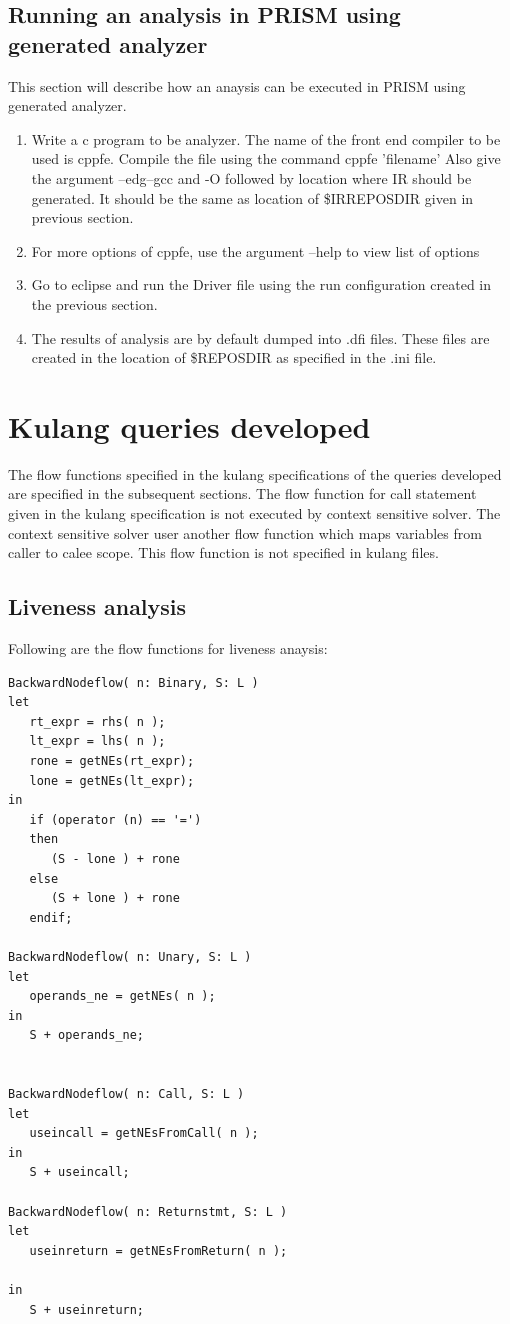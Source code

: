 \documentclass[12pt]{report}
\begin{document}
\section{Running an analysis in PRISM using generated analyzer}

This section will describe how an anaysis can be executed in PRISM using generated analyzer.

\begin{enumerate}
\item Write a c program to be analyzer. The name of the front end compiler to be used is cppfe. Compile the file using the command cppfe 'filename' Also give the argument --edg--gcc and -O followed by location where IR should be generated. It should be the same as location of \$IRREPOSDIR given in previous section.
\item For more options of cppfe, use the argument --help to view list of options
\item Go to eclipse and run the Driver file using the run configuration created in the previous section.
\item The results of analysis are by default dumped into .dfi files. These files are created in the location of \$REPOSDIR as specified in the .ini file.
\end{enumerate}


\newpage
\chapter{Kulang queries developed}
The flow functions specified in the kulang specifications of the queries developed are specified in the subsequent sections. The flow function for call statement given in the kulang specification is not executed by context sensitive solver. The context sensitive solver user another flow function which maps variables from caller to calee scope. This flow function is not specified in kulang files. 

\section{Liveness analysis}

Following are the flow functions for liveness anaysis:

\begin{verbatim}
BackwardNodeflow( n: Binary, S: L ) 
let
   rt_expr = rhs( n );
   lt_expr = lhs( n );
   rone = getNEs(rt_expr);
   lone = getNEs(lt_expr);
in
   if (operator (n) == '=')
   then
      (S - lone ) + rone
   else
      (S + lone ) + rone
   endif;

BackwardNodeflow( n: Unary, S: L ) 
let 
   operands_ne = getNEs( n );
in
   S + operands_ne;


BackwardNodeflow( n: Call, S: L ) 
let
   useincall = getNEsFromCall( n );
in
   S + useincall;

BackwardNodeflow( n: Returnstmt, S: L ) 
let
   useinreturn = getNEsFromReturn( n );

in
   S + useinreturn;

\end{verbatim}
\end{document}
